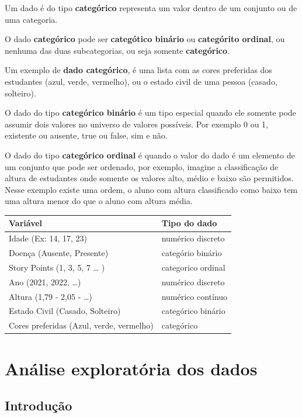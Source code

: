 \documentclass[
]{book}
\begin{document}
Um dado é do tipo \textbf{categórico} representa um valor dentro de um conjunto ou de uma categoria.

O dado \textbf{categórico} pode ser \textbf{categótico binário} ou \textbf{categórito ordinal}, ou nenhuma das duas subcategorias, ou seja somente \textbf{categórico}.

Um exemplo de \textbf{dado categórico}, é uma lista com as cores preferidas dos estudantes (azul, verde, vermelho), ou o estado civil de uma pessoa (casado, solteiro).

O dado do tipo \textbf{categórico binário} é um tipo especial quando ele somente pode assumir dois valores no universo de valores possíveis. Por exemplo 0 ou 1, existente ou ausente, true ou false, sim e não.

O dado do tipo \textbf{categórico ordinal} é quando o valor do dado é um elemento de um conjunto que pode ser ordenado, por exemplo, imagine a classificação de altura de estudantes onde somente os valores alto, médio e baixo são permitidos. Nesse exemplo existe uma ordem, o aluno com altura classificado como baixo tem uma altura menor do que o aluno com altura média.

\begin{longtable}[]{@{}ll@{}}
\toprule\noalign{}
Variável & Tipo do dado \\
\midrule\noalign{}
\endhead
\bottomrule\noalign{}
\endlastfoot
Idade (Ex: 14, 17, 23) & numérico discreto \\
Doença (Ausente, Presente) & categório binário \\
Story Points (1, 3, 5, 7 \ldots{} ) & categorico ordinal \\
Ano (2021, 2022, \ldots) & numérico discreto \\
Altura (1,79 - 2,05 - \ldots) & numérico contínuo \\
Estado Civil (Casado, Solteiro) & categórico binário \\
Cores preferidas (Azul, verde, vermelho) & categórico \\
\end{longtable}

\hypertarget{anuxe1lise-exploratuxf3ria-dos-dados}{%
\chapter{Análise exploratória dos dados}\label{anuxe1lise-exploratuxf3ria-dos-dados}}

\hypertarget{introduuxe7uxe3o-1}{%
\section{Introdução}\label{introduuxe7uxe3o-1}}
\end{document}
